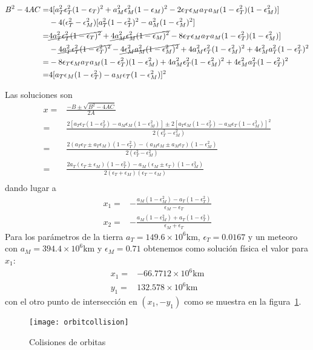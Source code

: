 \begin{align*}
  B^2-4AC=&4[a^2_T\epsilon_T^2(1-\epsilon_T)^2+a^2_M\epsilon_M^2(1-\epsilon_M)^2-2\epsilon_T\epsilon_Ma_Ta_M(1-\epsilon_T^2)(1-\epsilon_M^2)]\nonumber\\
  &-4(\epsilon_T^2-\epsilon_M^2)[a_T^2(1-\epsilon_T^2)^2-a_M^2(1-\epsilon_M^2)^2]\nonumber\\
  =&\cancel{4a^2_T\epsilon_T^2(1-\epsilon_T)^2}+\cancel{4a^2_M\epsilon_M^2(1-\epsilon_M)^2}-8\epsilon_T\epsilon_Ma_Ta_M(1-\epsilon_T^2)(1-\epsilon_M^2)]\nonumber\\
  &-\cancel{4a_T^2\epsilon_T^2(1-\epsilon_T^2)^2}
-\cancel{4\epsilon_M^2a_M^2(1-\epsilon_M^2)^2}
+4a_M^2\epsilon_T^2(1-\epsilon_M^2)^2+4\epsilon_M^2a_T^2(1-\epsilon_T^2)^2\nonumber\\
     =&-8\epsilon_T\epsilon_Ma_Ta_M(1-\epsilon_T^2)(1-\epsilon_M^2)
+4a_M^2\epsilon_T^2(1-\epsilon_M^2)^2+4\epsilon_M^2a_T^2(1-\epsilon_T^2)^2\nonumber\\
=&4[a_T\epsilon_M(1-\epsilon_T^2)-a_M\epsilon_T(1-\epsilon_M^2)]^2
 \end{align*}

Las soluciones son
\begin{align*}
  x=&\frac{-B\pm\sqrt{B^2-4AC}}{2A}\nonumber\\
  =&\frac{2[a_T\epsilon_T(1-\epsilon_T^2)-a_M\epsilon_M(1-\epsilon_M^2)]\pm
2[a_T\epsilon_M(1-\epsilon_T^2)-a_M\epsilon_T(1-\epsilon_M^2)]^2}{2(\epsilon_T^2-\epsilon_M^2)}\nonumber\\
  =&\frac{2(a_T\epsilon_T\pm a_T\epsilon_M)(1-\epsilon_T^2)-(a_M\epsilon_M\pm a_M\epsilon_T)(1-\epsilon_M^2)}{2(\epsilon_T^2-\epsilon_M^2)}\nonumber\\
  =&\frac{2a_T(\epsilon_T\pm \epsilon_M)(1-\epsilon_T^2)-a_M(\epsilon_M\pm \epsilon_T)(1-\epsilon_M^2)}{2(\epsilon_T+\epsilon_M)(\epsilon_T-\epsilon_M)}\nonumber\\
\end{align*}
dando lugar a
\begin{align}
  \label{eq:xyoc}
  x_1=&-\frac{a_M(1-\epsilon_M^2)-a_T(1-\epsilon_T^2)}{\epsilon_M-\epsilon_T}\nonumber\\
  x_2=&-\frac{a_M(1-\epsilon_M^2)+a_T(1-\epsilon_T^2)}{\epsilon_M+\epsilon_T}
\end{align}
Para los parámetros de la tierra $a_T={149.6\times10^{6}}\si{\kilo\meter}$, $\epsilon_T=0.0167$ y un meteoro con $a_M={394.4\times10^{6}}\si{\kilo\meter}$ y $\epsilon_M=0.71$
obtenemos como solución física el valor para $x_1$:
\begin{align}
  x_1=&-{66.7712\times10^{6}}\si{\kilo\meter}\nonumber\\
  y_1=&{132.578\times10^{6}}\si{\kilo\meter}\,
\end{align}
con el otro punto de intersección en $(x_1,-y_1)$ como se muestra en la figura~\ref{fig:orbitcollision}.
\begin{figure}
  \centering
  
  \texttt{[image: orbitcollision]}
  \caption{Colisiones de orbitas}
  \label{fig:orbitcollision}
\end{figure}

